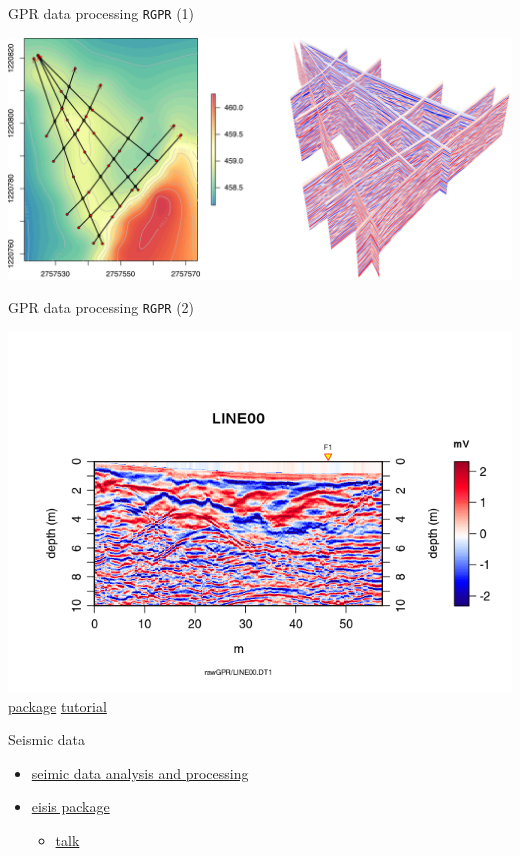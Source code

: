 \documentclass[9pt,ignorenonframetext,]{beamer}
\providecommand{\tightlist}{%
  \setlength{\itemsep}{0pt}\setlength{\parskip}{0pt}}
\begin{document}
\begin{frame}{GPR data processing \texttt{RGPR} (1)}

\includegraphics{imgPres/GPR_processing01.png}

\end{frame}

\begin{frame}{GPR data processing \texttt{RGPR} (2)}

\includegraphics{imgPres/GPR_processing02.png}
\href{https://github.com/emanuelhuber/RGPR}{package}
\href{http://emanuelhuber.github.io/RGPR/}{tutorial}

\end{frame}

\begin{frame}{Seismic data}

\begin{itemize}
\tightlist
\item
  \href{http://mazamascience.com/Classes/IRIS_2015/}{seimic data
  analysis and processing}
\item
  \href{https://www.earth-surf-dynam-discuss.net/esurf-2017-75/esurf-2017-75.pdf}{eisis
  package}

  \begin{itemize}
  \tightlist
  \item
    \href{http://www.unc.edu/~leesj/FETCH/GRAB/Vignettes/whyRbeam.pdf}{talk}
  \end{itemize}
\end{itemize}

\end{frame}
\end{document}
